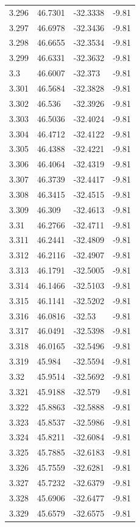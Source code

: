 \begin{tabular}{llll}
3.296 & 46.7301 & -32.3338 & -9.81 \\
3.297 & 46.6978 & -32.3436 & -9.81 \\
3.298 & 46.6655 & -32.3534 & -9.81 \\
3.299 & 46.6331 & -32.3632 & -9.81 \\
3.3 & 46.6007 & -32.373 & -9.81 \\
3.301 & 46.5684 & -32.3828 & -9.81 \\
3.302 & 46.536 & -32.3926 & -9.81 \\
3.303 & 46.5036 & -32.4024 & -9.81 \\
3.304 & 46.4712 & -32.4122 & -9.81 \\
3.305 & 46.4388 & -32.4221 & -9.81 \\
3.306 & 46.4064 & -32.4319 & -9.81 \\
3.307 & 46.3739 & -32.4417 & -9.81 \\
3.308 & 46.3415 & -32.4515 & -9.81 \\
3.309 & 46.309 & -32.4613 & -9.81 \\
3.31 & 46.2766 & -32.4711 & -9.81 \\
3.311 & 46.2441 & -32.4809 & -9.81 \\
3.312 & 46.2116 & -32.4907 & -9.81 \\
3.313 & 46.1791 & -32.5005 & -9.81 \\
3.314 & 46.1466 & -32.5103 & -9.81 \\
3.315 & 46.1141 & -32.5202 & -9.81 \\
3.316 & 46.0816 & -32.53 & -9.81 \\
3.317 & 46.0491 & -32.5398 & -9.81 \\
3.318 & 46.0165 & -32.5496 & -9.81 \\
3.319 & 45.984 & -32.5594 & -9.81 \\
3.32 & 45.9514 & -32.5692 & -9.81 \\
3.321 & 45.9188 & -32.579 & -9.81 \\
3.322 & 45.8863 & -32.5888 & -9.81 \\
3.323 & 45.8537 & -32.5986 & -9.81 \\
3.324 & 45.8211 & -32.6084 & -9.81 \\
3.325 & 45.7885 & -32.6183 & -9.81 \\
3.326 & 45.7559 & -32.6281 & -9.81 \\
3.327 & 45.7232 & -32.6379 & -9.81 \\
3.328 & 45.6906 & -32.6477 & -9.81 \\
3.329 & 45.6579 & -32.6575 & -9.81 \\

\end{tabular}
